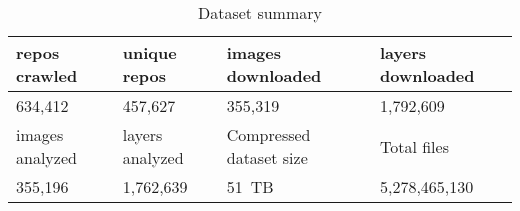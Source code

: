 
\begin{table}
	\scriptsize
	\caption{Dataset summary} \label{tab-dataset-summary}
	\begin{tabular}{|p{}|p{}|p{}|p{}|}%
		\hline
		repos crawled & unique repos & images downloaded  & layers downloaded \\
		\hline
		634,412             & 457,627             & 355,319                 & 1,792,609  \\
		\hline
		images analyzed & layers analyzed & Compressed dataset size  &  Total files \\
		\hline
		355,196               & 1,762,639             & 51~TB                     & 5,278,465,130  \\
		\hline
	\end{tabular}
\end{table}

